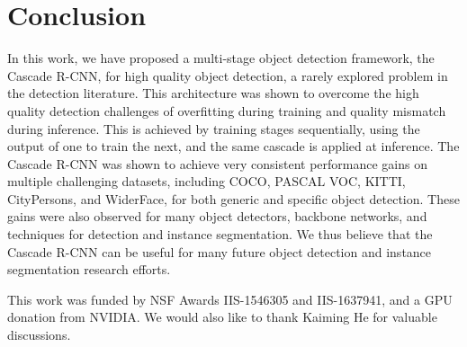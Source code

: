 \documentclass[10pt,journal,compsoc]{IEEEtran}
\begin{document}
\section{Conclusion}

In this work, we have proposed a multi-stage object detection framework,
the Cascade R-CNN, for high quality object detection, a rarely explored
problem in the detection literature. This architecture was shown to overcome
the high quality detection challenges of overfitting during training and
quality mismatch during inference. This is achieved by
training stages sequentially, using the output of one to train the next, and the same cascade is applied at inference.
The Cascade R-CNN was shown to achieve very consistent performance gains
on multiple challenging datasets, including
COCO, PASCAL VOC, KITTI, CityPersons, and WiderFace, for both generic
and specific object detection. These gains were also observed for
many object detectors, backbone networks, and techniques for
detection and instance segmentation. We thus believe that the Cascade
R-CNN can be useful for many future object detection and instance
segmentation research efforts.


\vspace{0.2cm}
This work was funded by NSF Awards IIS-1546305 and IIS-1637941, and a
GPU donation from NVIDIA. We would also
like to thank Kaiming He for valuable discussions.


{\small


}








\ifCLASSOPTIONcaptionsoff
  \newpage
\fi
\end{document}
